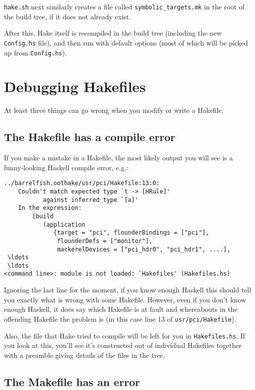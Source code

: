 \documentclass[a4paper,twoside]{report} %
\begin{document}
\texttt{hake.sh} next similarly creates a file called
\texttt{symbolic\_targets.mk} in the root of the build tree, if it
does not already exist. 

After this, Hake itself is recompiled in the build tree (including the
new \texttt{Config.hs} file), and then run with default options (most
of which will be picked up from \texttt{Config.hs}). 

\chapter{Debugging Hakefiles}

At least three things can go wrong when you modify or write a
Hakefile.  

\section{The Hakefile has a compile error}

If you make a mistake in a Hakefile, the most likely output you will
see is a funny-looking Haskell compile error, e.g.:
\begin{verbatim}
../barrelfish.oothake/usr/pci/Hakefile:13:0:
    Couldn't match expected type `t -> [HRule]'
           against inferred type `[a]'
    In the expression:
        [build
           (application
              {target = "pci", flounderBindings = ["pci"],
               flounderDefs = ["monitor"],
               mackerelDevices = ["pci_hdr0", "pci_hdr1", ....],
 \ldots
 \ldots
<command line>: module is not loaded: `Hakefiles' (Hakefiles.hs)
\end{verbatim}

Ignoring the last line for the moment, if you know enough Haskell this
should tell you exactly what is wrong with some Hakefile.   However,
even if you don't know enough Haskell, it does say which Hakefile is
at fault and whereabouts in the offending Hakefile the problem is (in
this case line 13 of \texttt{usr/pci/Hakefile}). 

Also, the file that Hake tried to compile will be left for you in
\texttt{Hakefiles.hs}.  If you look at this, you'll see it's
constructed out of individual Hakefile{s} together with a preamble
giving details of the files in the tree.  

\section{The Makefile has an error}
\end{document}
